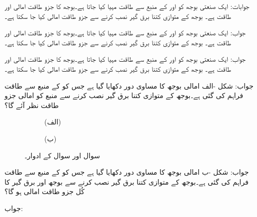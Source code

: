 جوابات: 
ایک صنعتی بوجھ کو  اور  کے منبع سے طاقت مہیا کیا جاتا ہے۔بوجھ کا جزو طاقت  امالی اور طاقت  ہے۔ بوجھ کے متوازی کتنا برق گیر نصب کرنے سے جزو طاقت  امالی کیا جا سکتا ہے۔

جواب:
ایک صنعتی بوجھ کو  اور  کے منبع سے طاقت مہیا کیا جاتا ہے۔بوجھ کا جزو طاقت  امالی اور طاقت  ہے۔ بوجھ کے متوازی کتنا برق گیر نصب کرنے سے جزو طاقت  امالی کیا جا سکتا ہے۔

جواب:
ایک صنعتی بوجھ کو  اور  کے منبع سے طاقت مہیا کیا جاتا ہے۔بوجھ کا جزو طاقت  امالی اور طاقت  ہے۔ بوجھ کے متوازی کتنا برق گیر نصب کرنے سے جزو طاقت  امالی کیا جا سکتا ہے۔

جواب:
شکل -الف امالی بوجھ کا مساوی دور  دکھایا گیا ہے جس کو  کے منبع سے طاقت فراہم کی گئی ہے۔بوجھ کے متوازی کتنا برق گیر نصب کرنے سے منبع کو  امالی جزو طاقت نظر آئے گا؟
\begin{figure}
\centering
\begin{subfigure}{0.5\textwidth}
\centering
{}
\caption*{(الف)}
\end{subfigure}%
\begin{subfigure}{0.5\textwidth}
\centering
{}
\caption*{(ب)}
\end{subfigure}%
\caption{سوال  اور سوال  کے ادوار۔}
\label{شکل_سوال_طاقت_مساوی_الف}
\end{figure}

جواب:
شکل -ب امالی بوجھ کا مساوی دور  دکھایا گیا ہے جس کو  کے منبع سے طاقت فراہم کی گئی ہے۔بوجھ کے متوازی کتنا برق گیر نصب کرنے سے  بوجھ اور برق گیر کا کُل جزو طاقت  امالی ہو گا؟

جواب:
